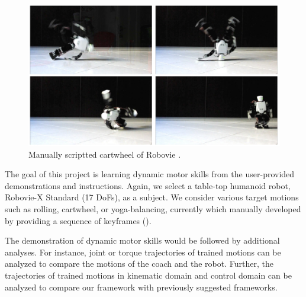 \begin{figure}[htbp]
\center
  \includegraphics[width=5.0in]{images/training2_cartwheel}
  \caption{Manually scriptted cartwheel of Robovie \cite{Youtube-Robovie-X}.}
 \label{fig:cartwheel}
\end{figure}

\indent

The goal of this project is learning dynamic motor skills
from the user-provided demonstrations and instructions.
Again, we select a table-top humanoid robot, 
Robovie-X Standard (17 DoFs), as a subject.
We consider various target motions 
such as rolling, cartwheel, or yoga-balancing,
currently which manually developed by providing a sequence of keyframes 
().

The demonstration of dynamic motor skills would be followed by
additional analyses.
For instance, joint or torque trajectories of trained motions 
can be analyzed to compare the motions of the coach and the robot.
Further, the trajectories of trained motions in kinematic domain 
and control domain can be analyzed to compare our framework
with previously suggested frameworks.

